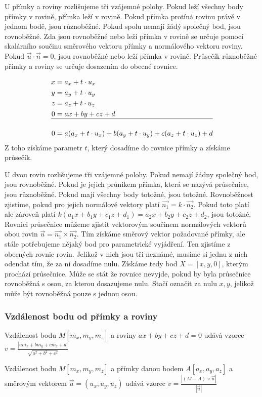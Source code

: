 \documentclass[12pt]{article}
\begin{document}
U přímky a roviny rozlišujeme tři vzájemné polohy. Pokud leží všechny body přímky v rovině, přímka
leží v rovině. Pokud přímka protíná rovinu právě v jednom bodě, jsou různoběžné. Pokud spolu nemají
žádý společný bod, jsou rovnoběžné. Zda jsou rovnoběžné nebo leží přímka v rovině se určuje pomocí
skalárního součinu směrového vektoru přímky a normálového vektoru roviny. Pokud $\vec{u} \cdot
\vec{n} = 0$, jsou rovnoběžné nebo leží přímka v rovině. Průsečík různoběžné přímky a roviny se
určuje dosazením do obecné rovnice.

\[
\begin{aligned}
    x &= a_x + t \cdot u_x \\
    y &= a_y + t \cdot u_y \\
    z &= a_z + t \cdot u_z \\
    0 &= ax + by + cz +d \\
    \hline \\
    0 &= a(a_x + t \cdot u_x) + b(a_y + t \cdot u_y) + c(a_z + t \cdot u_z) + d
\end{aligned}
\]
Z toho získáme parametr $t$, který dosadíme do rovnice přímky a získáme průsečík.

U dvou rovin rozlišujeme tři vzájemné polohy. Pokud nemají žádny společný bod, jsou rovnoběžné. Pokud
je jejich průnikem přímka, která se nazývá průsečnice, jsou různoběžné. Pokud mají všechny body
totožné, jsou totožné. Rovnoběžnost zjistíme, pokud pro jejich normálové vektory platí $\vec{n_1} = k
\cdot \vec{n_2}$. Pokud toto platí ale zároveň platí $k(a_1x + b_1y + c_1z + d_1) = a_2x + b_2y +c_2z
+ d_2$, jsou totožné. Rovnici průsečnice můžeme zjistit vektorovým součinem normálových vektorů obou
rovin $\vec{u} = \vec{n_1} \times \vec{n_2}$. Tím získáme směrový vektor požadované přímky, ale stále
potřebujeme nějaký bod pro parametrické vyjádření. Ten zjistíme z obecných rovnic rovin. Jelikož v
nich jsou tři neznámé, musíme si jednu z nich odendat tím, že za ní dosadíme nulu. Získáme tedy bod
$X = [x, y, 0]$, kterým prochází průsečnice. Může se stát že rovnice nevyjde, pokud by byla průsečnice
rovnoběžná s osou, za kterou dosazujeme nulu. Stačí označit za nulu $x, y$, jelikož může být
rovnoběžná pouze s jednou osou.

\subsubsection*{Vzdálenost bodu od přímky a roviny}
Vzdálenost bodu $M[m_x, m_y, m_z]$ a roviny $ax + by + cz + d = 0$ udává vzorec $v = \frac{|am_x +
bm_y + cm_z + d|}{\sqrt{a^2 + b^2 + c^2}}$

Vzdálenost bodu $M[m_x, m_y, m_z]$ a přímky danou bodem $A[a_x, a_y, a_z]$ a směrovým vektorem
$\vec{u} = (u_x, u_y, u_z)$ udává vzorec $v = \frac{|(M - A) \times \vec{u}|}{|\vec{u}|}$
\end{document}
